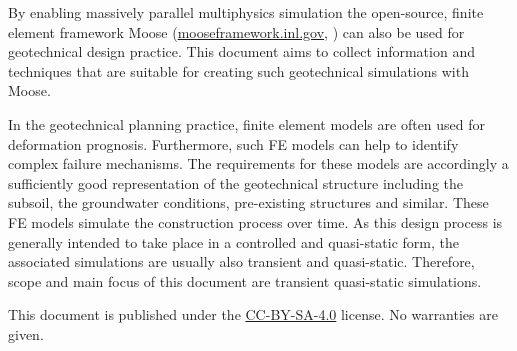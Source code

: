 By enabling massively parallel multiphysics simulation the open-source, finite
element framework Moose
(\href{https://mooseframework.inl.gov}{mooseframework.inl.gov},
) can also be used for geotechnical design
practice. This document aims to collect information and techniques that are
suitable for creating such geotechnical simulations with Moose.

In the geotechnical planning practice, finite element models are often used for
deformation prognosis. Furthermore, such FE models can help to identify complex
failure mechanisms. The requirements for these models are accordingly a
sufficiently good representation of the geotechnical structure including the
subsoil, the groundwater conditions, pre-existing structures and similar. These
FE models simulate the construction process over time. As this design process
is generally intended to take place in a controlled and quasi-static form, the
associated simulations are usually also transient and quasi-static. Therefore,
scope and main focus of this document are transient quasi-static simulations.


This document is published under the
\href{https://creativecommons.org/licenses/by-sa/4.0/}{CC-BY-SA-4.0} license.
No warranties are given.